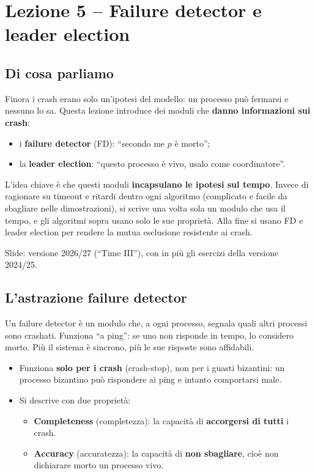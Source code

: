 \chapter{Lezione 5 -- Failure detector e leader election}

\section{Di cosa parliamo}

Finora i crash erano solo un'ipotesi del modello: un processo può fermarsi e nessuno lo sa. Questa lezione introduce dei moduli che \textbf{danno informazioni sui crash}:

\begin{itemize}
\tightlist
\item
  i \textbf{failure detector} (FD): ``secondo me \(p\) è morto'';
\item
  la \textbf{leader election}: ``questo processo è vivo, usalo come coordinatore''.
\end{itemize}

L'idea chiave è che questi moduli \textbf{incapsulano le ipotesi sul tempo}. Invece di ragionare su timeout e ritardi dentro ogni algoritmo (complicato e facile da sbagliare nelle dimostrazioni), si scrive una volta sola un modulo che usa il tempo, e gli algoritmi sopra usano solo le sue proprietà. Alla fine si usano FD e leader election per rendere la mutua esclusione resistente ai crash.

Slide: versione 2026/27 (``Time III''), con in più gli esercizi della versione 2024/25.

\section{L'astrazione failure detector}

\begin{inbreve}

Un failure detector è un modulo che, a ogni processo, segnala quali altri processi sono crashati. Funziona ``a ping'': se uno non risponde in tempo, lo considero morto. Più il sistema è sincrono, più le sue risposte sono affidabili.

\end{inbreve}

\begin{itemize}
\tightlist
\item
  Funziona \textbf{solo per i crash} (crash-stop), non per i guasti bizantini: un processo bizantino può rispondere ai ping e intanto comportarsi male.
\item
  Si descrive con due proprietà:

  \begin{itemize}
  \tightlist
  \item
    \textbf{Completeness} (completezza): la capacità di \textbf{accorgersi di tutti} i crash.
  \item
    \textbf{Accuracy} (accuratezza): la capacità di \textbf{non sbagliare}, cioè non dichiarare morto un processo vivo.
  \end{itemize}
\end{itemize}

